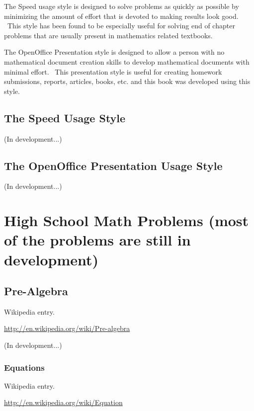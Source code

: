\documentclass[12pt,twoside]{book}
\begin{document}
\bigskip

The Speed usage style is designed to solve problems as quickly as
possible by minimizing the amount of effort that is devoted to making
results look good. \ This style has been found to be especially useful
for solving end of chapter problems that are usually present in
mathematics related textbooks.


\bigskip

The OpenOffice Presentation style is designed to allow a person with no
mathematical document creation skills to develop mathematical documents
with minimal effort. \ This presentation style is useful for creating
homework submissions, reports, articles, books, etc. and this book was
developed using this style.

\section[The Speed Usage Style]{The Speed Usage Style}
(In development...)

\section[The OpenOffice Presentation Usage Style]{The
OpenOffice Presentation Usage Style}
(In development...)


\bigskip


\bigskip

\chapter[High School Math Problems]{High School Math Problems (most of the problems
are still in development)}

\section[Pre{}-Algebra]{Pre{}-Algebra}
Wikipedia entry.

\href{http://en.wikipedia.org/wiki/Pre-algebra}{http://en.wikipedia.org/wiki/Pre{}-algebra}

(In development...)

\subsection[Equations]{Equations}
Wikipedia entry.

\href{http://en.wikipedia.org/wiki/Equation}{http://en.wikipedia.org/wiki/Equation}
\end{document}
